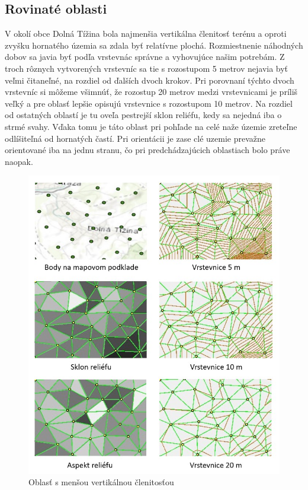 \documentclass[12pt]{article}
\begin{document}
\subsection*{Rovinaté oblasti}
V okolí obce Dolná Tížina bola najmenšia vertikálna členitosť terénu a oproti zvyšku hornatého územia sa zdala byť relatívne plochá. Rozmiestnenie náhodných dobov sa javia byť podľa vrstevnác správne a vyhovujúce našim potrebám. Z troch rôznych vytvorených vrstevníc sa tie s rozostupom 5 metrov nejavia byť veľmi čitaneľné, na rozdiel od ďalších dvoch krokov. Pri porovnaní týchto dvoch vrstevníc si môžeme všimnúť, že rozostup 20 metrov medzi vrstevnicami je príliš veľký a pre oblasť lepšie opisujú vrstevnice s rozostupom 10 metrov. Na rozdiel od ostatných oblastí je tu oveľa pestrejší sklon reliéfu, kedy sa nejedná iba o strmé svahy. Vďaka tomu je táto oblast pri pohľade na celé naže územie zreteľne odlíšiteľná od hornatých častí. Pri orientácii je zase clé uzemie prevažne orientované iba na jednu stranu, čo pri predchádzajúcich oblastiach bolo práve naopak.  
\begin{figure}[h]
    \centering
    \includegraphics[width=0.56\linewidth]{latex/images/plocha.jpg}
    \caption{Oblasť s menšou vertikálnou členitosťou}
    \label{fig:enter-label}
\end{figure}
\end{document}
